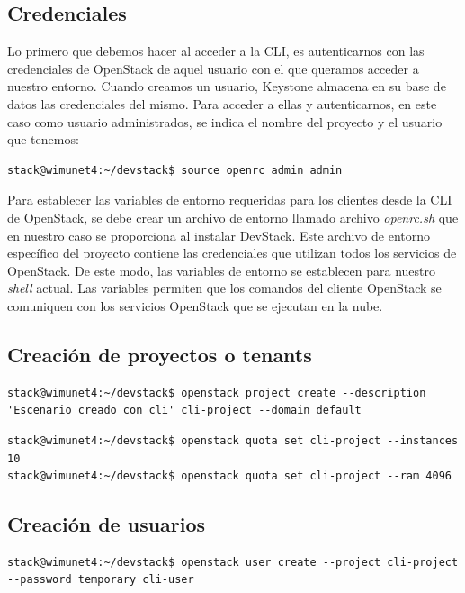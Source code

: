 \subsection{Credenciales}
Lo primero que debemos hacer al acceder a la CLI, es autenticarnos con las credenciales de OpenStack de aquel usuario con el que queramos acceder a nuestro entorno. Cuando creamos un usuario, Keystone almacena en su base de datos las credenciales del mismo. Para acceder a ellas y autenticarnos, en este caso como usuario administrados, se indica el nombre del proyecto y el usuario que tenemos:

\begin{lstlisting}[style=Consola]
stack@wimunet4:~/devstack$ source openrc admin admin
\end{lstlisting}

Para establecer las variables de entorno requeridas para los clientes desde la CLI de OpenStack, se debe crear un archivo de entorno llamado archivo \textit{openrc.sh} que en nuestro caso se proporciona al instalar DevStack. Este archivo de entorno específico del proyecto contiene las credenciales que utilizan todos los servicios de OpenStack. De este modo, las variables de entorno se establecen para nuestro \textit{shell} actual. Las variables permiten que los comandos del cliente OpenStack se comuniquen con los servicios OpenStack que se ejecutan en la nube.\cite{noauthor_openrc_nodate}

\subsection{Creación de proyectos o tenants}
\begin{lstlisting}[style=Consola]
stack@wimunet4:~/devstack$ openstack project create --description 'Escenario creado con cli' cli-project --domain default
\end{lstlisting}

\begin{lstlisting}[style=Consola]
stack@wimunet4:~/devstack$ openstack quota set cli-project --instances 10
stack@wimunet4:~/devstack$ openstack quota set cli-project --ram 4096 
\end{lstlisting}

\subsection{Creación de usuarios}
\begin{lstlisting}[style=Consola]
stack@wimunet4:~/devstack$ openstack user create --project cli-project --password temporary cli-user
\end{lstlisting}

